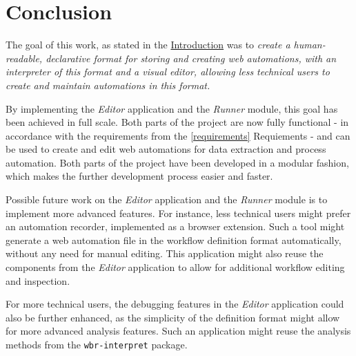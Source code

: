 \chapter{Conclusion}

The goal of this work, as stated in the \hyperref[intro]{Introduction} was to \textit{create a human-readable, declarative format for
storing and creating web automations, with an interpreter of this format and a
visual editor, allowing less technical users to create and maintain automations in
this format.}

By implementing the \textit{Editor} application and the \textit{Runner} module, this goal has been achieved in full scale.
Both parts of the project are now fully functional - in accordance with the requirements from the \autoref{requirements} Requiements - and can be used to create and edit web automations
for data extraction and process automation.
Both parts of the project have been developed in a modular fashion, which makes the further development process easier and faster.

Possible future work on the \textit{Editor} application and the \textit{Runner} module is to implement more advanced features.
For instance, less technical users might prefer an automation recorder, implemented as a browser extension.
Such a tool might generate a web automation file in the workflow definition format automatically, without any need for manual editing.
This application might also reuse the components from the \textit{Editor} application to allow for additional workflow editing and inspection.

For more technical users, the debugging features in the \textit{Editor} application could also be further enhanced, as the simplicity of the definition format might allow for more advanced 
analysis features. Such an application might reuse the analysis methods from the \texttt{wbr-interpret} package.